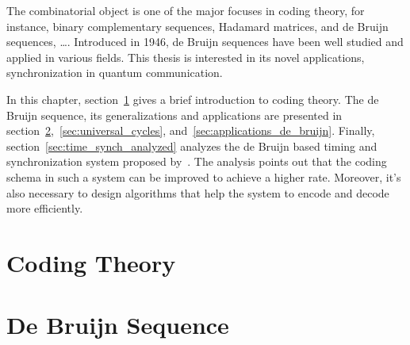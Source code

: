 The combinatorial object is one of the major focuses in coding theory, for instance, binary complementary sequences, Hadamard matrices, and de Bruijn sequences, \dots. Introduced in 1946, de Bruijn sequences have been well studied and applied in various fields. This thesis is interested in its novel applications, synchronization in quantum communication.

In this chapter, section~\ref{sec:coding_theory} gives a brief introduction to coding theory. The de Bruijn sequence, its generalizations and applications are presented in section~\ref{sec:debbruijn},~\ref{sec:universal_cycles}, and~\ref{sec:applications_de_bruijn}. Finally, section~\ref{sec:time_synch_analyzed} analyzes the de Bruijn based timing and synchronization system proposed by~\citeauthor{zhang2021timing}. The analysis points out that the coding schema in such a system can be improved to achieve a higher rate. Moreover, it's also necessary to design algorithms that help the system to encode and decode more efficiently.




\section{Coding Theory}\label{sec:coding_theory}


\section{De Bruijn Sequence}\label{sec:debbruijn}


